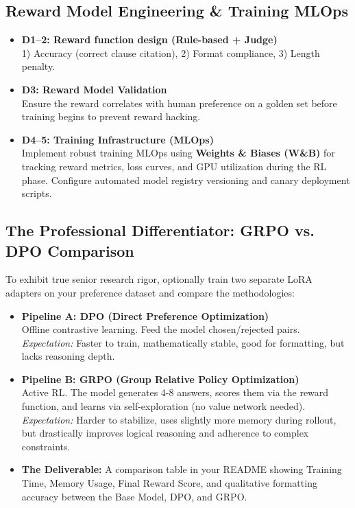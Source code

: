 \documentclass[11pt,a4paper]{article}
\begin{document}
\subsection*{Reward Model Engineering \& Training MLOps}

\begin{tcolorbox}[systembox={ Step-by-Step}]
\begin{itemize}[leftmargin=*]
    \item \textbf{D1–2: Reward function design (Rule-based + Judge)}\\
          1) Accuracy (correct clause citation), 2) Format compliance, 3) Length penalty.
    \item \textbf{D3: Reward Model Validation}\\
          Ensure the reward correlates with human preference on a golden set before training begins to prevent reward hacking.
    \item \textbf{D4–5: Training Infrastructure (MLOps)}\\
          Implement robust training MLOps using \textbf{Weights \& Biases (W\&B)} for tracking reward metrics, loss curves, and GPU utilization during the RL phase. Configure automated model registry versioning and canary deployment scripts.
\end{itemize}
\end{tcolorbox}

\subsection*{The Professional Differentiator: GRPO vs. DPO Comparison}

\begin{tcolorbox}[comparativebox={ Optional Comparative Analysis: GRPO vs. DPO}]
To exhibit true senior research rigor, optionally train two separate LoRA adapters on your preference dataset and compare the methodologies:

\begin{itemize}[leftmargin=*]
    \item \textbf{Pipeline A: DPO (Direct Preference Optimization)}\\
          Offline contrastive learning. Feed the model chosen/rejected pairs.
          \textit{Expectation:} Faster to train, mathematically stable, good for formatting, but lacks reasoning depth.
    \item \textbf{Pipeline B: GRPO (Group Relative Policy Optimization)}\\
          Active RL. The model generates 4-8 answers, scores them via the reward function, and learns via self-exploration (no value network needed).
          \textit{Expectation:} Harder to stabilize, uses slightly more memory during rollout, but drastically improves logical reasoning and adherence to complex constraints.
    \item \textbf{The Deliverable:} A comparison table in your README showing Training Time, Memory Usage, Final Reward Score, and qualitative formatting accuracy between the Base Model, DPO, and GRPO.
\end{itemize}
\end{tcolorbox}
\end{document}
